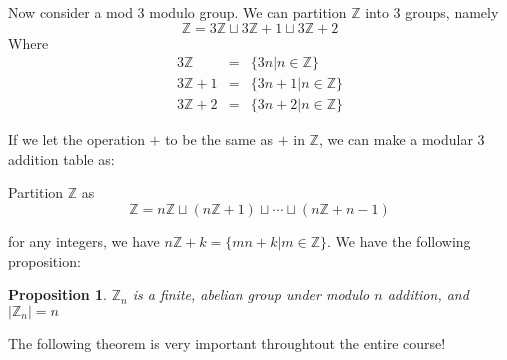 \documentclass{article}
\theoremstyle{MyNonumberplain}
\theoremstyle{break}
\newcommand{\Z}{\mathbb{Z}}
\theoremstyle{break}
\newtheorem{proposition}{Proposition}[section]
\theoremstyle{break}
\theoremstyle{definition}
\theoremstyle{break}
\begin{document}
Now consider a mod 3 modulo group. We can partition $\Z$ into 3 groups, namely 
$$\Z=3\Z\sqcup 3\Z +1 \sqcup 3\Z +2$$
Where
\begin{eqnarray}
    3\Z & = & \{3n|n\in\Z\}\nonumber\\
    3\Z + 1 & = & \{3n + 1|n\in\Z\}\nonumber\\
    3\Z + 2 & = & \{3n + 2|n\in\Z\}\nonumber
\end{eqnarray}

If we let the operation $+$ to be the same as $+$ in $\Z$, we can make a modular 3 addition table as: 

\begin{center}
    {}
\end{center}

Partition $\Z$ as $$\mathbb{Z}= n\mathbb{Z} \sqcup (n\mathbb{Z}+ 1) \sqcup \cdots \sqcup
(n\mathbb{Z}+ n - 1)$$

for any integers, we have $n\Z+k=\{mn+k|m\in\Z\}$. We have the following proposition:

\begin{thmbox}
    \begin{proposition}
        $\Z_n$ is a finite, abelian group under modulo $n$ addition, and $|\Z_n|=n$
    \end{proposition}    
\end{thmbox}

The following theorem is very important throughtout the entire course!
\end{document}
